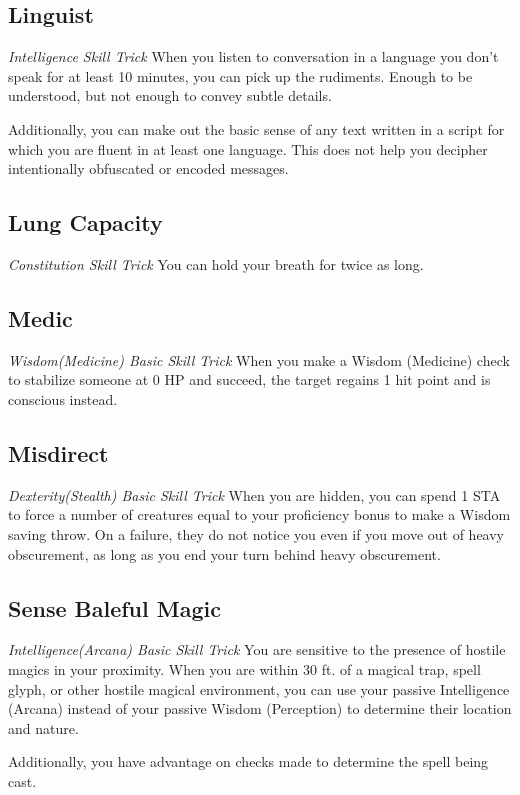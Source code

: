 \subsection{Linguist}
\textit{Intelligence Skill Trick}
When you listen to conversation in a language you don't speak for at least 10 minutes, you can pick up the rudiments. Enough to be understood, but not enough to convey subtle details.

Additionally, you can make out the basic sense of any text written in a script for which you are fluent in at least one language. This does not help you decipher intentionally obfuscated or encoded messages.

\subsection{Lung Capacity}
\textit{Constitution Skill Trick}
You can hold your breath for twice as long.

\subsection{Medic}
\textit{Wisdom(Medicine) Basic Skill Trick}
When you make a Wisdom (Medicine) check to stabilize someone at 0 HP and succeed, the target regains 1 hit point and is conscious instead.

\subsection{Misdirect}
\textit{Dexterity(Stealth) Basic Skill Trick}
When you are hidden, you can spend 1 STA to force a number of creatures equal to your proficiency bonus to make a Wisdom saving throw. On a failure, they do not notice you even if you move out of heavy obscurement, as long as you end your turn behind heavy obscurement.

\subsection{Sense Baleful Magic}
\textit{Intelligence(Arcana) Basic Skill Trick}
You are sensitive to the presence of hostile magics in your proximity. When you are within 30 ft. of a magical trap, spell glyph, or other hostile magical environment, you can use your passive Intelligence (Arcana) instead of your passive Wisdom (Perception) to determine their location and nature.

Additionally, you have advantage on checks made to determine the spell being cast.

